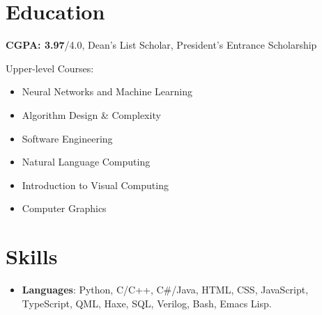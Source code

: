 {	\section{Education}
	\begin{itemize}
        \setlength\itemsep{0pt}
        \item \textbf{CGPA: 3.97}/4.0, Dean's List Scholar, President's Entrance Scholarship
        {
        \footnotesize
        \item  Upper-level Courses:
        \setlength\multicolsep{0pt}
        \begin{multicols}{3}
        \begin{itemize} \setlength\itemsep{0pt}
            \item Neural Networks and Machine Learning
            \item Algorithm Design \& Complexity
            \item Software Engineering
            \item Natural Language Computing 
            \item Introduction to Visual Computing
            \item Computer Graphics
        \end{itemize}
        \end{multicols}
        }
    \end{itemize}

	\section{Skills}
	{
    \begin{itemize} \setlength\itemsep{0pt}
    \item
        \textbf{Languages}:
        Python, 
        C/C++, 
        C\#/Java, 
        HTML, 
        CSS, 
        JavaScript,
        TypeScript,
        QML,
        Haxe, 
        SQL,
        Verilog,
        Bash,
        Emacs Lisp.


\end{itemize}}}
